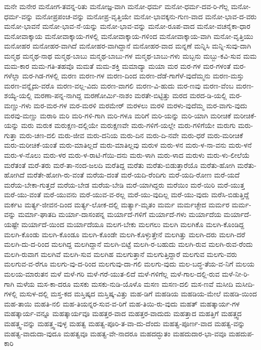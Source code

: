 {ಮನೇ
ಮನೇರ
ಮನೋಗ-ತವನ್ನ-ರಿತು
ಮನೋಜ್ಞ-ವಾಗಿ
ಮನೋ-ಧರ್ಮ
ಮನೋ-ಧರ್ಮ-ದವ-ರಿ-ಗೆಲ್ಲ
ಮನೋ-ಧರ್ಮ-ವನ್ನು
ಮನೋಪ್ರಪಂಚ-ವನ್ನು
ಮನೋಪ್ರ-ವೃತ್ತಿಯೇ
ಮನೋ-ಭಾವಕ್ಕನು-ಗುಣ-ವಾದ
ಮನೋ-ಭಾವ-ದ-ವರು
ಮನೋ-ಭಾವನೆ
ಮನೋ-ಭಾವ-ನೆ-ಯನ್ನು
ಮನೋ-ಭಾವ-ವನ್ನು
ಮನೋ-ರೂಪ-ವಾದ
ಮನೋ-ವಚನೈಕಾ-ಧಾರ
ಮನೋವಾಕ್ಕಾಯ
ಮನೋವಾಕ್ಕಾಯ-ಗಳಲ್ಲಿ
ಮನೋವಾಕ್ಕಾಯ-ಗಳಿಂದ
ಮನೋವಾಕ್ಕಾಯ-ವಾಗಿ
ಮನೋ-ವೃತ್ತಿಯು
ಮನೋಹರ
ಮನೋಹರ-ವಾಗಿದೆ
ಮನೋಹರ-ವಾಗಿದ್ದಾನೆ
ಮನೋಹರ-ವಾದ
ಮನ್ನಣೆ
ಮನ್ನಿಸಿ
ಮನ್ನಿ-ಸುವು-ದಾಗಿ
ಮನ್ಮಥ
ಮನ್ಮಥ-ನಾಥ
ಮನ್ಮಥ-ಬಾಬು
ಮನ್ಮಥ-ಬಾಬು-ಗಳ
ಮನ್ಮಥ-ಬಾಬು-ಗಳು
ಮಬ್ಬನು
ಮಬ್ಬು-ಕವಿ-ಸುವ
ಮಮ
ಮಮ-ಕಾರ
ಮಮ-ಗತಿ-ತಹವೊ
ಮಮತೆ
ಮಮ-ಶಕ್ತಿ
ಮಮಾದ್ಯಾ
ಮಯಾ
ಮರ
ಮರ-ಗಳ
ಮರ-ಗಳಂತೆ
ಮರ-ಗಳೆಲ್ಲಾ
ಮರ-ಗಿಡ-ಗಳಲ್ಲಿ
ಮರಣ
ಮರಣ-ಗಳ
ಮರಣ-ದಿಂದ
ಮರಣ-ದೆಡೆ-ಗಾಗೆಳೆ-ವುದೆಮ್ಮನು
ಮರಣ-ಮಸ್ತು
ಮರಣ-ವನ್ನೈದು-ವರೊ
ಮರಣ-ವಲ್ಲ-ವಿದು
ಮರಣ-ವಾಗಲಿ
ಮರಣ-ವಿ-ಹುದು
ಮರ-ಣವು
ಮರಣ-ವೆಂಬ
ಮರಣ-ಶಯ್ಯೆ-ಯಲ್ಲಿ
ಮರಣಾ-ಪನ್ನ-ನಾಗಿದ್ದ
ಮರಣೋರ್ಮಿ-ನಾಶಂ
ಮರತೇ-ಬಿಟ್ಟಿತ್ತು
ಮರದ
ಮರದ-ಡಿ-ಯಲ್ಲಿ
ಮರ-ಮಣ್ಣು-ಗಳು
ಮರ-ಮರ-ಗಳ
ಮರ-ಮರಳಿ
ಮರಮೇರ್
ಮರಳಲು
ಮರಳಿ
ಮರಳು-ವುದೆಮ್ಮ
ಮರ-ವಾಗು-ವುದು
ಮರವು-ಮಣ್ಣು
ಮರಾಠಿ
ಮರಿ
ಮರಿ-ಗಳಿ-ಗಾಗಿ
ಮರಿ-ಗಳೂ
ಮರಿಗೆ
ಮರಿ-ಯನ್ನು
ಮರಿ-ಯಾಗಿ
ಮರೀಚಿಕೆ
ಮರೀಚಿಕೆ-ಯನ್ನು
ಮರು
ಮರುಕ
ಮರುಕ್ಷಣ-ದಲ್ಲಿಯೇ
ಮರುಕ್ಷಣವೇ
ಮರು-ಗಳಿಗೆ-ಯಲ್ಲೇ
ಮರು-ಗಳಿಗೆಯೇ
ಮರುಗು
ಮರು-ಗುತ್ತಾ
ಮರು-ಚಣ-ದಲಿ
ಮರು-ಜೀವ
ಮರು-ದನಿಯ
ಮರು-ದಿನ
ಮರು-ದಿ-ನವೇ
ಮರು-ಧರೆ
ಮರು-ಮರೀಚಿಕೆ
ಮರು-ಮರೀಚಿಕೆ-ಯಂತೆ
ಮರು-ಮಾತಿಲ್ಲದೆ
ಮರು-ಮಾತಿಲ್ಲವು
ಮರುಳ
ಮರು-ಳನ
ಮರು-ಳ-ನಾ-ವನು
ಮರು-ಳನೆ
ಮರು-ಳ-ನೊಲು
ಮರು-ಳರ
ಮರು-ಳ-ರಾಟಿ-ಗೆಯಿ-ದನು
ಮರು-ಳಾಗಿ
ಮರು-ಳಾದ
ಮರುಳು
ಮರು-ಳು-ಲೀಲೆಯೆ
ಮರೆತಂತೆ
ಮರೆ-ತರು
ಮರೆ-ತಾ-ನಂದ-ಜಲದಿ
ಮರೆತಿದ್ದ
ಮರೆತು
ಮರೆತು-ಬಿಡುತ್ತಾರೆಯೊ
ಮರೆತು-ಹೋಗಿ
ಮರೆತು-ಹೋಗಿದೆ
ಮರೆತೇ-ಹೋಗಿ-ರು-ವಂತೆ
ಮರೆಯ-ದಂತೆ
ಮರೆ-ಯದಿ-ರೆಂದಿಗು
ಮರೆ-ಯದಿ-ರೋಣ
ಮರೆ-ಯದೆ
ಮರೆಯ-ಬೇಕಾ-ಗುತ್ತದೆ
ಮರೆಯ-ಬೇಡ
ಮರೆಯ-ಬೇಡಿ
ಮರೆ-ಯಾಗಿದ್ದರು
ಮರೆಯಿಂ
ಮರೆ-ಯಿರಿ
ಮರೆ-ಯುತ್ತ
ಮರೆ-ಯು-ವಂತೆ
ಮರೆ-ಯುವನು
ಮರೆ-ಯುವ-ವ-ರಲ್ಲ
ಮರೆ-ಯು-ವುದಿಲ್ಲ
ಮರೆ-ಯು-ವುದು
ಮರೆಸಿ-ಬಿಡುತ್ತಿದ್ದೆ
ಮರ್ಕಟ
ಮರ್ತ್ಯ-ಜೀವನ-ದಿಂದ
ಮರ್ತ್ಯ-ಲೋಕ-ದಲ್ಲಿ
ಮರ್ತ್ಯಾ-ಮೃತಂ
ಮರ್ಮ
ಮರ್ಮಚ್ಛೇದ
ಮರ್ಮರ
ಮರ್ಮ-ವನ್ನು
ಮರ್ಮಾ-ಘಾತದಿ
ಮರ್ಯಾ-ದಾಸಂಪನ್ನ
ಮರ್ಯಾದೆ-ಗಳಿಗೆ
ಮರ್ಯಾದೆ-ಗಳು
ಮರ್ಯಾದೆಯ
ಮರ್ಯಾದೆ-ಯಷ್ಟೇ
ಮರ್ಯಾದೆ-ಯಿಂದ
ಮರ್ಯಾದೆಯೂ
ಮಲಗ-ಬೇಕು
ಮಲಗಲು
ಮಲಗಿ
ಮಲಗಿಕೊ
ಮಲಗಿ-ಕೊಂಡಿದ್ದ
ಮಲಗಿ-ಕೊಂಡು
ಮಲಗಿ-ಕೊಂಡೂ
ಮಲಗಿ-ಕೊಂಡೇ
ಮಲಗಿ-ಕೊಳ್ಳುತ್ತೇನೆ
ಮಲಗಿತ್ತು
ಮಲಗಿ-ದರು
ಮಲಗಿ-ದರೆ
ಮಲಗಿ-ದು-ದ-ರಿಂದ
ಮಲಗಿದ್ದ
ಮಲಗಿದ್ದಾನೆ
ಮಲಗಿ-ಬಿಟ್ಟೆ
ಮಲಗಿ-ರ-ಬಹುದು
ಮಲಗಿ-ರುವ
ಮಲಗಿ-ರುವ-ರೆಂದು
ಮಲಗಿ-ರುವಾಗ
ಮಲಗಿವೆ
ಮಲಗಿ-ಸುವ
ಮಲಗಿಹ
ಮಲಗುತ್ತಾನೆ
ಮಲಗುತ್ತಿದ್ದಾರೆ
ಮಲಗುವ
ಮಲಗು-ವರು
ಮಲಗುವ-ವ-ರೆಗೂ
ಮಲಗು-ವು-ದ-ರಿಂದ
ಮಲಗುವು-ದಾ-ಗಲಿ
ಮಲಗು-ವುದು
ಮಲ-ಬದ್ಧ-ತೆಯ-ವ-ನಿಗೆ
ಮಲಯ
ಮಲಯ-ಮಾರುತನ
ಮಳೆ
ಮಳೆ-ಗರಿ
ಮಳೆ-ಗರೆ-ಯುತ-ಲಿದೆ
ಮಳೆ-ಗಳಿಗೆಲ್ಲ
ಮಳೆ-ಗಾಲ-ದಲ್ಲಿ-ರುವ
ಮಳೆ-ನೀ-ರಿ-ಗಾಗಿ
ಮಳೆಯ
ಮಸ-ಕಾ-ದರೂ
ಮಸಕು
ಮಸಕು-ನುಡಿ-ಯೊಳೊ
ಮಸಣ
ಮಸಣ-ದಲಿ
ಮಸ-ಣವೆ
ಮಸೀದಿ
ಮಸೀದಿ-ಗಳಲ್ಲಿ
ಮಸುಳ-ದಲ್ಲಿ
ಮಸ್ತ-ಕದ
ಮಸ್ತಿಷ್ಕದ
ಮಸ್ತಿಷ್ಕ-ವಿತ್ತು
ಮಹ-ಡಿಗೆ
ಮಹಡಿಯ
ಮಹಡಿಯ-ಮೇಲೆ
ಮಹಡಿ-ಯಿಂದ
ಮಹ-ತಾಯಿ
ಮಹತಿ-ನಲಿ
ಮಹ-ತಿಯನ್ನರ-ಸುವ-ವ-ರಿಗೆ
ಮಹ-ತಿಯಿ-ರು-ವುದು
ಮಹತ್
ಮಹತ್ಕಾರ್ಯ-ಗಳ
ಮಹತ್ಕಾರ್ಯ-ವನ್ನೂ
ಮಹತ್ಕಾರ್ಯವೂ
ಮಹತ್ತರ-ವಾದ
ಮಹತ್ತರ-ವಾದುದು
ಮಹತ್ತಾದ
ಮಹತ್ತಿಗೆ
ಮಹತ್ತ್ವದ
ಮಹತ್ತ್ವ-ವನ್ನು
ಮಹತ್ತ್ವ-ವುಳ್ಳ
ಮಹತ್ವ
ಮಹತ್ವ-ಪೂರಿ-ತ-ವಾ-ದು-ದೆಂದು
ಮಹತ್ವ-ಪೂರ್ಣ-ವಾದ
ಮಹತ್ವ-ವನ್ನು
ಮಹತ್ವ-ವಾದುದಾ-ವುದೂ
ಮಹತ್ವವೂ
ಮಹತ್ವ-ವೇ-ನಾದರೂ
ಮಹದದ್ಭುತಂ
ಮಹದುದಾರ-ಭಾ-ವವೂ
ಮಹದುಪ-ಕಾರಿ
}
